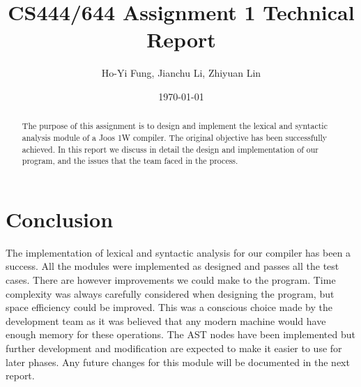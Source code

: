 \documentclass[notitlepage]{report}
\title{CS444/644 Assignment 1 Technical Report}
\author{Ho-Yi Fung, Jianchu Li, Zhiyuan Lin}
\date{\today}
\begin{document}
{\let\newpage\relax\maketitle}
\begin{abstract}
The purpose of this assignment is to design and implement the lexical and syntactic analysis module of a Joos 1W compiler. The original objective has been successfully achieved. In this report we discuss in detail the design and implementation of our program, and the issues that the team faced in the process.
\end{abstract}


\tableofcontents











\chapter{Conclusion}
The implementation of lexical and syntactic analysis for our compiler has been a success. All the modules were implemented as designed and passes all the test cases. There are however improvements we could make to the program. Time complexity was always carefully considered when designing the program, but space efficiency could be improved. This was a conscious choice made by the development team as it was believed that any modern machine would have enough memory for these operations. The AST nodes have been implemented but further development and modification are expected to make it easier to use for later phases. Any future changes for this module will be documented in the next report.



\end{document}
